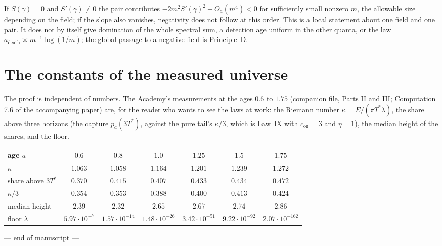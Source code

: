 \documentclass[11pt]{article}
\theoremstyle{definition}
\theoremstyle{remark}
\newcommand{\Tst}{T^{*}}
\newcommand{\con}{c_{\mathrm{on}}}
\begin{document}
If $S(\gamma)=0$ and $S'(\gamma)\ne0$ the pair contributes $-2m^2S'(\gamma)^2+O_a(m^4)<0$ for sufficiently small nonzero $m$, the allowable size depending on the field; if the slope also vanishes, negativity does not follow at this order. This is a local statement about one field and one pair. It does not by itself give domination of the whole spectral sum, a detection age uniform in the other quanta, or the law $a_{\mathrm{death}}\asymp m^{-1}\log(1/m)$; the global passage to a negative field is Principle~D.

\section{The constants of the measured universe}

The proof is independent of numbers. The Academy's measurements at the ages $0.6$ to $1.75$ (companion file, Parts II and III; Computation 7.6 of the accompanying paper) are, for the reader who wants to see the laws at work: the Riemann number $\kappa=E/(\pi\Tst\lambda)$, the share above three horizons (the capture $p_a(3\Tst)$, against the pure tail's $\kappa/3$, which is Law~IX with $\con=3$ and $\eta=1$), the median height of the shares, and the floor.

\begin{center}
\begin{tabular}{@{}lcccccc@{}}
\toprule
age $a$ & $0.6$ & $0.8$ & $1.0$ & $1.25$ & $1.5$ & $1.75$\\
\midrule
$\kappa$ & $1.063$ & $1.058$ & $1.164$ & $1.201$ & $1.239$ & $1.272$\\
share above $3\Tst$ & $0.370$ & $0.415$ & $0.407$ & $0.433$ & $0.434$ & $0.472$\\
$\kappa/3$ & $0.354$ & $0.353$ & $0.388$ & $0.400$ & $0.413$ & $0.424$\\
median height & $2.39$ & $2.32$ & $2.65$ & $2.67$ & $2.74$ & $2.86$\\
floor $\lambda$ & $5.97\cdot10^{-7}$ & $1.57\cdot10^{-14}$ & $1.48\cdot10^{-26}$ & $3.42\cdot10^{-51}$ & $9.22\cdot10^{-92}$ & $2.07\cdot10^{-162}$\\
\bottomrule
\end{tabular}
\end{center}

\bigskip
\begin{center}--- end of manuscript ---\end{center}
\bigskip
\end{document}
